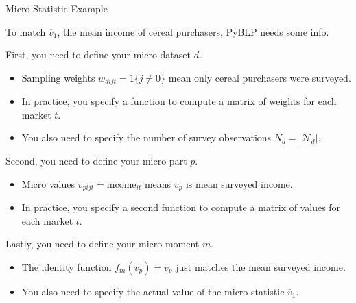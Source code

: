 \documentclass[aspectratio=169,t,11pt,table]{beamer}
\begin{document}
\begin{frame}{Micro Statistic Example}
    \begin{wideitemize}
        \item To match $\overline{v}_1$, the mean income of cereal purchasers, PyBLP needs some info.
        \pause
        \item First, you need to define your \alert{micro dataset} $d$.
        \begin{itemize}
            \item Sampling weights $w_{dijt} = 1\{j \neq 0\}$ mean only cereal purchasers were surveyed.
            \item In practice, you specify a function to compute a matrix of weights for each market $t$.
            \item You also need to specify the number of survey observations $N_d = |\mathcal{N}_d|$.
        \end{itemize}
        \pause
        \item Second, you need to define your \alert{micro part} $p$.
        \begin{itemize}
            \item Micro values $v_{pijt} = \text{income}_{it}$ means $\overline{v}_p$ is mean surveyed income.
            \item In practice, you specify a second function to compute a matrix of values for each market $t$.
        \end{itemize}
        \pause
        \item Lastly, you need to define your \alert{micro moment} $m$.
        \begin{itemize}
            \item The identity function $f_m(\overline{v}_p) = \overline{v}_p$ just matches the mean surveyed income.
            \item You also need to specify the actual value of the micro statistic $\overline{v}_1$.
        \end{itemize}
    \end{wideitemize}
\end{frame}
\end{document}
